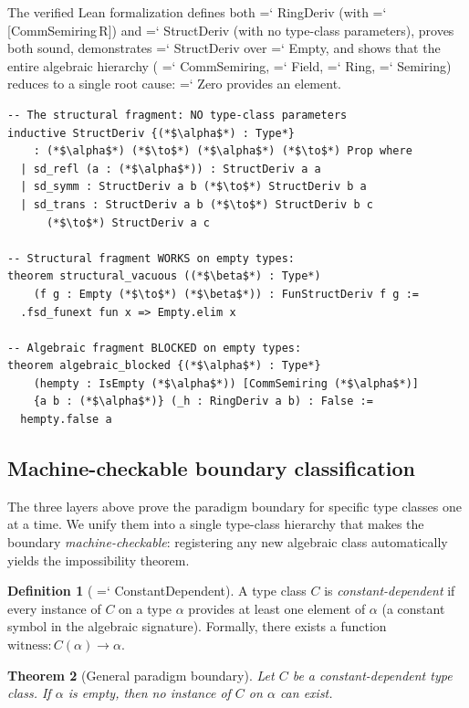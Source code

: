 \documentclass[11pt]{article}
\renewcommand{\texttt}[1]{%
  \begingroup\ttfamily\hyphenchar\font=`\-\relax
  \def\_{\textunderscore\discretionary{}{}{}}%
  #1\endgroup}
\newtheorem{theorem}{Theorem}
\theoremstyle{definition}
\newtheorem{definition}[theorem]{Definition}
\theoremstyle{remark}
\begin{document}
\noindent The verified Lean formalization defines both
\texttt{RingDeriv} (with \texttt{[CommSemiring\,R]}) and
\texttt{StructDeriv} (with no type-class parameters), proves
both sound, demonstrates \texttt{StructDeriv} over \texttt{Empty},
and shows that the entire algebraic hierarchy (\texttt{CommSemiring},
\texttt{Field}, \texttt{Ring}, \texttt{Semiring}) reduces to a
single root cause: \texttt{Zero} provides an element.

\begin{lstlisting}
-- The structural fragment: NO type-class parameters
inductive StructDeriv {(*$\alpha$*) : Type*}
    : (*$\alpha$*) (*$\to$*) (*$\alpha$*) (*$\to$*) Prop where
  | sd_refl (a : (*$\alpha$*)) : StructDeriv a a
  | sd_symm : StructDeriv a b (*$\to$*) StructDeriv b a
  | sd_trans : StructDeriv a b (*$\to$*) StructDeriv b c
      (*$\to$*) StructDeriv a c

-- Structural fragment WORKS on empty types:
theorem structural_vacuous ((*$\beta$*) : Type*)
    (f g : Empty (*$\to$*) (*$\beta$*)) : FunStructDeriv f g :=
  .fsd_funext fun x => Empty.elim x

-- Algebraic fragment BLOCKED on empty types:
theorem algebraic_blocked {(*$\alpha$*) : Type*}
    (hempty : IsEmpty (*$\alpha$*)) [CommSemiring (*$\alpha$*)]
    {a b : (*$\alpha$*)} (_h : RingDeriv a b) : False :=
  hempty.false a
\end{lstlisting}

\subsection{Machine-checkable boundary classification}

The three layers above prove the paradigm boundary for specific
type classes one at a time.  We unify them into a single
type-class hierarchy that makes the boundary \emph{machine-checkable}:
registering any new algebraic class automatically yields the
impossibility theorem.

\begin{definition}[\texttt{ConstantDependent}]%
\label{def:constant_dependent}
A type class $C$ is \emph{constant-dependent} if every instance of
$C$ on a type $\alpha$ provides at least one element of $\alpha$
(a constant symbol in the algebraic signature).  Formally, there
exists a function $\mathrm{witness} : C(\alpha) \to \alpha$.
\end{definition}

\begin{theorem}[General paradigm boundary]%
\label{thm:machine_boundary}
Let $C$ be a constant-dependent type class.  If $\alpha$ is empty,
then no instance of $C$ on $\alpha$ can exist.
\end{theorem}
\end{document}
